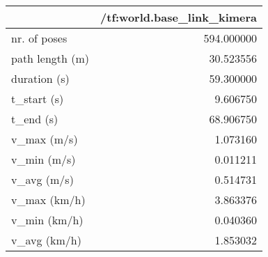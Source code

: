 \begin{tabular}{lr}
\toprule
{} &  /tf:world.base\_link\_kimera \\
\midrule
nr. of poses    &                  594.000000 \\
path length (m) &                   30.523556 \\
duration (s)    &                   59.300000 \\
t\_start (s)     &                    9.606750 \\
t\_end (s)       &                   68.906750 \\
v\_max (m/s)     &                    1.073160 \\
v\_min (m/s)     &                    0.011211 \\
v\_avg (m/s)     &                    0.514731 \\
v\_max (km/h)    &                    3.863376 \\
v\_min (km/h)    &                    0.040360 \\
v\_avg (km/h)    &                    1.853032 \\
\bottomrule
\end{tabular}
